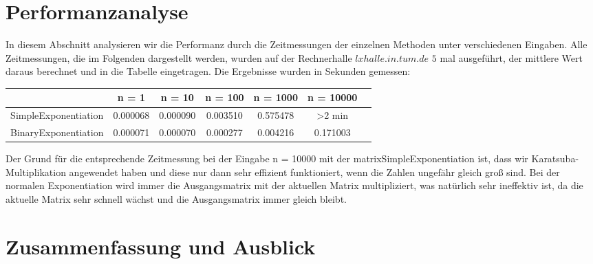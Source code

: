 \documentclass[course=erap]{aspdoc}
\begin{document}
\section{Performanzanalyse}
In diesem Abschnitt analysieren wir die Performanz durch die Zeitmessungen der einzelnen Methoden unter verschiedenen Eingaben. Alle Zeitmessungen, die im Folgenden dargestellt werden, wurden auf der Rechnerhalle $lxhalle.in.tum.de$ $5$ mal ausgeführt, der mittlere Wert daraus berechnet und in die Tabelle eingetragen. Die Ergebnisse wurden in Sekunden gemessen:
\begin{center}
    \begin{tabular}{|c|c|c|c|c|c|c}
    \hline
  & n = 1 & n = 10 & n = 100 & n = 1000 & n = 10000 \\
\hline
SimpleExponentiation & 0.000068 & 0.000090 & 0.003510 & 0.575478 & >2 min \\
\hline
BinaryExponentiation & 0.000071  & 0.000070  & 0.000277 & 0.004216 & 0.171003 \\ 
\hline
    \end{tabular}
\end{center}
Der Grund für die entsprechende Zeitmessung bei der Eingabe n = 10000 mit der matrixSimpleExponentiation ist, dass wir Karatsuba-Multiplikation angewendet haben und diese nur dann sehr effizient funktioniert, wenn die Zahlen ungefähr gleich groß sind. Bei der normalen Exponentiation wird immer die Ausgangsmatrix mit der aktuellen Matrix multipliziert, was natürlich sehr ineffektiv ist, da die aktuelle Matrix sehr schnell wächst und die Ausgangsmatrix immer gleich bleibt.

\section{Zusammenfassung und Ausblick}


{}
\end{document}
